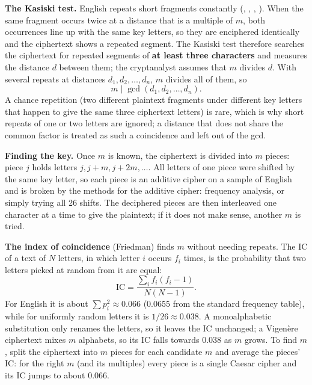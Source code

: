 \textbf{The Kasiski test.} English repeats short fragments constantly (, , , ). When the same fragment occurs twice at a distance that is a multiple of $m$, both occurrences line up with the same key letters, so they are enciphered identically and the ciphertext shows a repeated segment. The Kasiski test therefore searches the ciphertext for repeated segments of \textbf{at least three characters} and measures the distance $d$ between them; the cryptanalyst assumes that $m$ divides $d$. With several repeats at distances $d_1, d_2, \dots, d_n$, $m$ divides all of them, so
\[
m \mid \gcd(d_1, d_2, \dots, d_n).
\]
A chance repetition (two different plaintext fragments under different key letters that happen to give the same three ciphertext letters) is rare, which is why short repeats of one or two letters are ignored; a distance that does not share the common factor is treated as such a coincidence and left out of the gcd.

\textbf{Finding the key.} Once $m$ is known, the ciphertext is divided into $m$ pieces: piece $j$ holds letters $j, j + m, j + 2m, \dots$. All letters of one piece were shifted by the same key letter, so each piece is an additive cipher on a sample of English and is broken by the methods for the additive cipher: frequency analysis, or simply trying all 26 shifts.  The deciphered pieces are then interleaved one character at a time to give the plaintext; if it does not make sense, another $m$ is tried.

\textbf{The index of coincidence} (Friedman) finds $m$ without needing repeats. The IC of a text of $N$ letters, in which letter $i$ occurs $f_i$ times, is the probability that two letters picked at random from it are equal:
\[
\text{IC} = \frac{\sum_{i} f_i (f_i - 1)}{N (N - 1)} .
\]
For English it is about $\sum p_i^2 \approx 0.066$ (0.0655 from the standard frequency table), while for uniformly random letters it is $1/26 \approx 0.038$. A monoalphabetic substitution only renames the letters, so it leaves the IC unchanged; a Vigen\`ere ciphertext mixes $m$ alphabets, so its IC falls towards 0.038 as $m$ grows. To find $m$, split the ciphertext into $m$ pieces for each candidate $m$ and average the pieces' IC: for the right $m$ (and its multiples) every piece is a single Caesar cipher and its IC jumps to about 0.066.

